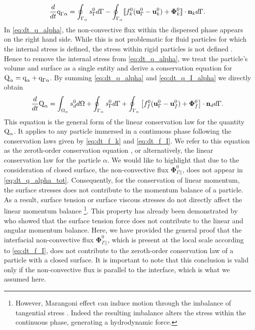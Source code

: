 \documentclass[11pt]{My_preprint}
\providecommand{\DIFadd}[1]{{\protect\color{blue}\uwave{#1}}} %
\providecommand{\DIFaddbegin}{} %
\providecommand{\DIFaddend}{} %
\begin{document}
\begin{equation}
    \ddt  \text q_{\Gamma\alpha}
    = \intS{ 
        s_\Gamma^0
    }
    - \intS{
 \Jump{
        f_k^0 (\textbf{u}_\Gamma^0 - \textbf{u}_k^0)
        + \mathbf{\Phi}_k^0
    }
    }.
    \label{eq:dt_q_I_alpha}
\end{equation}
In \ref{eq:dt_q_alpha}, the non-convective flux within the dispersed phase appears on the right hand side. While this is not problematic for fluid particles for which the internal stress is defined, the stress within rigid particles is not defined \citep{batchelor1970stress}.
Hence to remove the internal stress from \ref{eq:dt_q_alpha}, we treat the particle's volume and surface as a single entity and derive a conservation equation for $\text Q_\alpha = \text q_\alpha + \text q_{\Gamma\alpha}$. 
By summing \ref{eq:dt_q_alpha} and \ref{eq:dt_q_I_alpha} we directly obtain 
\begin{equation}
    \ddt  \text Q_\alpha
    = 
    \intO{ s_d^0 }
    + \intS{ s_\Gamma^0 }
    + \intS{ \left[
        f_f^0 (\textbf{u}_\Gamma^0-\textbf{u}_f^0) 
        + \mathbf{\Phi}_f^0 
        \right] \cdot \textbf{n}_d }. 
    \label{eq:dt_q_alpha_tot}
\end{equation}
This equation is the general form of the linear conservation law for the quantity $\text Q_\alpha$.
It applies to any particle immersed in a continuous phase following the conservation laws given by \ref{eq:dt_f_k} and \ref{eq:dt_f_I}.
We refer to this equation as the zeroth-order conservation equation \DIFaddbegin \DIFadd{of $f_d^0$}\DIFaddend , or alternatively, the linear conservation law \DIFaddbegin \DIFadd{of $f_d^0$, }\DIFaddend for the particle $\alpha$.
We would like to highlight that due to the consideration of closed surface, the non-convective flux $\mathbf{\Phi}_{\Gamma||}^0$, does not appear in \ref{eq:dt_q_alpha_tot}.
Consequently, for the conservation of linear momentum, the surface stresses does not contribute to the momentum balance of a particle.
As a result, surface tension or surface viscous stresses do not directly affect the linear momentum balance \footnote{However, Marangoni effect can induce motion through the imbalance of tangential stress \citep{young1959}. Indeed the resulting imbalance alters the stress within the continuous phase, generating a hydrodynamic force.}. 
This property has already been demonstrated by \citet{hesla1993note} who showed that the surface tension force does not contribute to the linear and angular momentum balance. 
Here, we have provided the general proof that the interfacial non-convective flux $\mathbf{\Phi}_{\Gamma||}^0$, which is present at the local scale according to \ref{eq:dt_f_I}, does not contribute to the zeroth-order conservation law of a particle with a closed surface.
It is important to note that this conclusion is valid only if the non-convective flux is parallel to the interface, which is what we assumed here.
\end{document}
